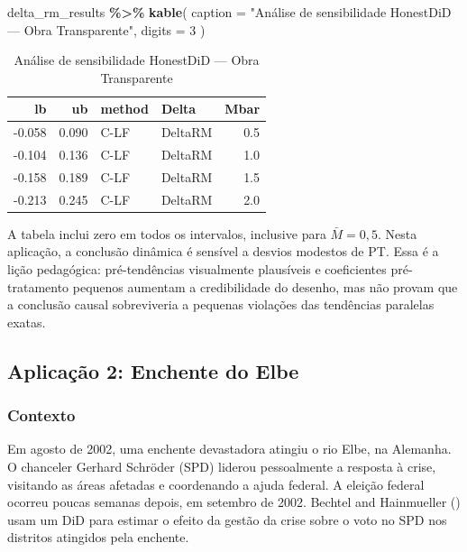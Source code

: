 \documentclass[
]{article}
\newenvironment{Shaded}{\begin{snugshade}}{\end{snugshade}}
\newcommand{\AttributeTok}[1]{\textcolor[rgb]{0.13,0.29,0.53}{#1}}
\newcommand{\DecValTok}[1]{\textcolor[rgb]{0.00,0.00,0.81}{#1}}
\newcommand{\FunctionTok}[1]{\textcolor[rgb]{0.13,0.29,0.53}{\textbf{#1}}}
\newcommand{\NormalTok}[1]{#1}
\newcommand{\SpecialCharTok}[1]{\textcolor[rgb]{0.81,0.36,0.00}{\textbf{#1}}}
\newcommand{\StringTok}[1]{\textcolor[rgb]{0.31,0.60,0.02}{#1}}
\begin{document}
\begin{Shaded}
\begin{Highlighting}[]
\NormalTok{delta\_rm\_results }\SpecialCharTok{\%\textgreater{}\%}
  \FunctionTok{kable}\NormalTok{(}
    \AttributeTok{caption =} \StringTok{"Análise de sensibilidade HonestDiD — Obra Transparente"}\NormalTok{,}
    \AttributeTok{digits =} \DecValTok{3}
\NormalTok{  )}
\end{Highlighting}
\end{Shaded}

\begin{table}

\caption{\label{tab:honestdid}Análise de sensibilidade HonestDiD — Obra Transparente}
\centering
\begin{tabular}[t]{r|r|l|l|r}
\hline
lb & ub & method & Delta & Mbar\\
\hline
-0.058 & 0.090 & C-LF & DeltaRM & 0.5\\
\hline
-0.104 & 0.136 & C-LF & DeltaRM & 1.0\\
\hline
-0.158 & 0.189 & C-LF & DeltaRM & 1.5\\
\hline
-0.213 & 0.245 & C-LF & DeltaRM & 2.0\\
\hline
\end{tabular}
\end{table}

A tabela inclui zero em todos os intervalos, inclusive para \(\bar{M}=0{,}5\). Nesta aplicação, a conclusão dinâmica é sensível a desvios modestos de PT. Essa é a lição pedagógica: pré-tendências visualmente plausíveis e coeficientes pré-tratamento pequenos aumentam a credibilidade do desenho, mas não provam que a conclusão causal sobreviveria a pequenas violações das tendências paralelas exatas.

\subsection{Aplicação 2: Enchente do Elbe}\label{aplicauxe7uxe3o-2-enchente-do-elbe}

\subsubsection{Contexto}\label{contexto}

Em agosto de 2002, uma enchente devastadora atingiu o rio Elbe, na Alemanha. O chanceler Gerhard Schröder (SPD) liderou pessoalmente a resposta à crise, visitando as áreas afetadas e coordenando a ajuda federal. A eleição federal ocorreu poucas semanas depois, em setembro de 2002. Bechtel and Hainmueller () usam um DiD para estimar o efeito da gestão da crise sobre o voto no SPD nos distritos atingidos pela enchente.
\end{document}

